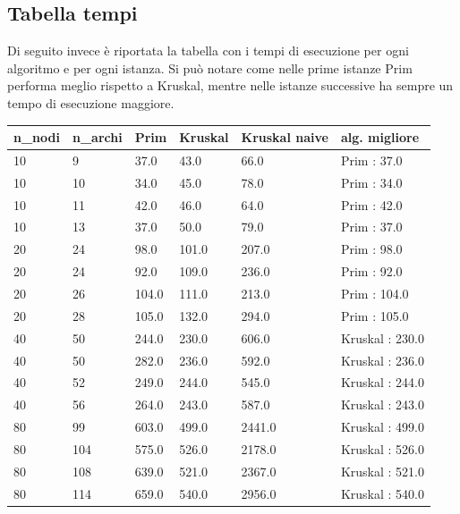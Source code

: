 \subsection{Tabella tempi}
\label{tabellaTempi}
Di seguito invece è riportata la tabella con i tempi di esecuzione per ogni algoritmo e per ogni istanza. Si può notare come nelle prime istanze Prim performa meglio rispetto a Kruskal, mentre nelle istanze successive ha sempre un tempo di esecuzione maggiore.


\renewcommand{\arraystretch}{2}
\begin{longtable}[H]{|p{1.5cm}|p{1.5cm}|p{2cm}|p{2cm}|p{3cm}|p{3cm}|} 
    \rowcolor{white}
    \multicolumn{6}{c}{Continua alla pagina seguente...}
    \endfoot
    \rowcolor{white}
    \endlastfoot
    \hline
    \rowcolor{lightgray}
    \textbf{n\_nodi} & \textbf{n\_archi} & \textbf{Prim} & \textbf{Kruskal} & \textbf{Kruskal naive} & \textbf{alg. migliore}\\ \hline\hline
    \endhead
    10 & 9 & 37.0 & 43.0 & 66.0 & Prim : 37.0 \\ \hline
    10 & 10 & 34.0 & 45.0 & 78.0 & Prim : 34.0 \\ \hline
    10 & 11 & 42.0 & 46.0 & 64.0 & Prim : 42.0 \\ \hline
    10 & 13 & 37.0 & 50.0 & 79.0 & Prim : 37.0 \\ \hline
    20 & 24 & 98.0 & 101.0 & 207.0 & Prim : 98.0 \\ \hline
    20 & 24 & 92.0 & 109.0 & 236.0 & Prim : 92.0 \\ \hline
    20 & 26 & 104.0 & 111.0 & 213.0 & Prim : 104.0 \\ \hline
    20 & 28 & 105.0 & 132.0 & 294.0 & Prim : 105.0 \\ \hline
    40 & 50 & 244.0 & 230.0 & 606.0 & Kruskal : 230.0 \\ \hline
    40 & 50 & 282.0 & 236.0 & 592.0 & Kruskal : 236.0 \\ \hline
    40 & 52 & 249.0 & 244.0 & 545.0 & Kruskal : 244.0 \\ \hline
    40 & 56 & 264.0 & 243.0 & 587.0 & Kruskal : 243.0 \\ \hline
    80 & 99 & 603.0 & 499.0 & 2441.0 & Kruskal : 499.0 \\ \hline
    80 & 104 & 575.0 & 526.0 & 2178.0 & Kruskal : 526.0 \\ \hline
    80 & 108 & 639.0 & 521.0 & 2367.0 & Kruskal : 521.0 \\ \hline
    80 & 114 & 659.0 & 540.0 & 2956.0 & Kruskal : 540.0 \\ \hline

\end{longtable}
